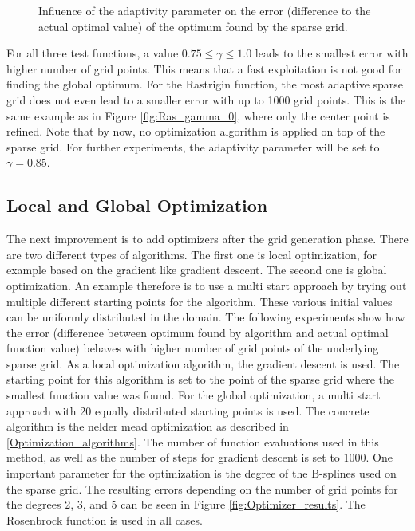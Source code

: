 \begin{figure}[htb!]
	\caption{ Influence of the adaptivity parameter on the error (difference to the actual optimal value) of the optimum found by the sparse grid. }	
	\label{fig:Functions_results}
\end{figure}

For all three test functions, a value $ 0.75 \le \gamma \le 1.0 $ leads to the smallest error with higher number of grid points. This means that a fast exploitation is not good for finding the global optimum. For the Rastrigin function, the most adaptive sparse grid does not even lead to a smaller error with up to 1000 grid points. This is the same example as in Figure \ref{fig:Ras_gamma_0}, where only the center point is refined. Note that by now, no optimization algorithm is applied on top of the sparse grid. For further experiments, the adaptivity parameter will be set to $ \gamma = 0.85 $. \newline 

\subsection{Local and Global Optimization}

The next improvement is to add optimizers after the grid generation phase. There are two different types of algorithms. The first one is local optimization, for example based on the gradient like gradient descent. The second one is global optimization. An example therefore is to use a multi start approach by trying out multiple different starting points for the algorithm. These various initial values can be uniformly distributed in the domain. The following experiments show how the error (difference between optimum found by algorithm and actual optimal function value) behaves with higher number of grid points of the underlying sparse grid. As a local optimization algorithm, the gradient descent is used. The starting point for this algorithm is set to the point of the sparse grid where the smallest function value was found. For the global optimization, a multi start approach with 20 equally distributed starting points is used. The concrete algorithm is the nelder mead optimization as described in \ref{Optimization_algorithms}. The number of function evaluations used in this method, as well as the number of steps for gradient descent is set to 1000. One important parameter for the optimization is the degree of the B-splines used on the sparse grid. The resulting errors depending on the number of grid points for the degrees 2, 3, and 5 can be seen in Figure \ref{fig:Optimizer_results}. The Rosenbrock function is used in all cases.

